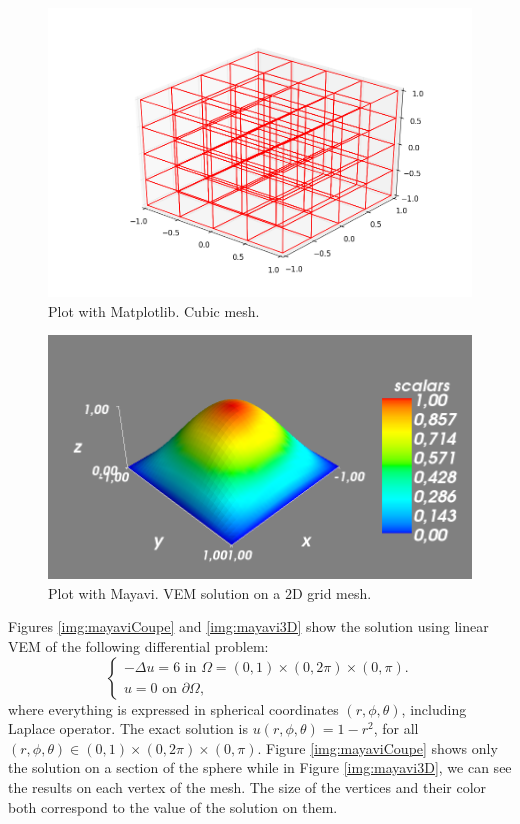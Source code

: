 \begin{figure}[!h]
\centering
\includegraphics[scale=0.4]{images/matplotlibPlotMesh.png}
\caption{Plot with Matplotlib. Cubic mesh.}
\label{img:matplotlibMesh}
\end{figure}

\begin{figure}[!h]
\centering
\includegraphics[scale=0.35]{images/mayavi2D.png}
\caption{Plot with Mayavi. VEM solution on a $2$D grid mesh.}
\label{img:mayavi2D}
\end{figure}

Figures \ref{img:mayaviCoupe} and \ref{img:mayavi3D} show the solution using linear VEM of the following differential problem:
\begin{equation*}
\begin{cases}
-\Delta u = 6 \text{ in } \Omega=(0,1)\times (0,2\pi) \times (0,\pi).\\
u = 0 \text{ on } \partial \Omega,
\end{cases}
\end{equation*}
where everything is expressed in spherical coordinates $(r,\phi,\theta)$, including Laplace operator. The exact solution is $u(r,\phi,\theta)=1-r^2$, for all $(r,\phi,\theta)\in (0,1)\times (0,2\pi) \times (0,\pi)$. Figure \ref{img:mayaviCoupe} shows only the solution on a section of the sphere while in Figure \ref{img:mayavi3D}, we can see the results on each vertex of the mesh. The size of the vertices and their color both correspond to the value of the solution on them. 

